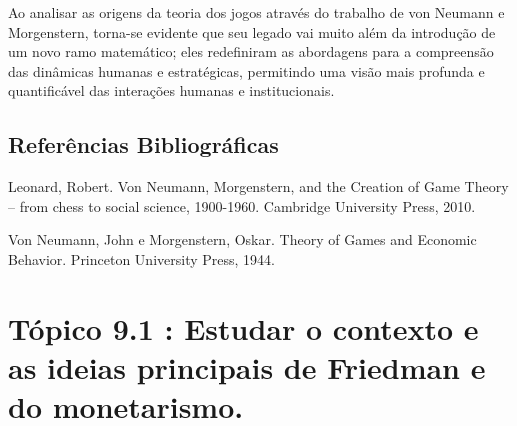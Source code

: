 \documentclass[a4paper,12pt]{article}[abntex2]
\begin{document}
Ao analisar as origens da teoria dos jogos através do trabalho de von Neumann e Morgenstern, torna-se evidente que seu legado vai muito além da introdução de um novo ramo matemático; eles redefiniram as abordagens para a compreensão das dinâmicas humanas e estratégicas, permitindo uma visão mais profunda e quantificável das interações humanas e institucionais.

\subsection{\textbf{Referências Bibliográficas}}
Leonard, Robert. Von Neumann, Morgenstern, and the Creation of Game Theory – from chess to social science, 1900-1960. Cambridge University Press, 2010.

Von Neumann, John e Morgenstern, Oskar. Theory of Games and Economic Behavior.
Princeton University Press, 1944.

\newpage
\section{\textbf{Tópico 9.1 : Estudar o contexto e as ideias principais de Friedman e do monetarismo.}}
\end{document}
